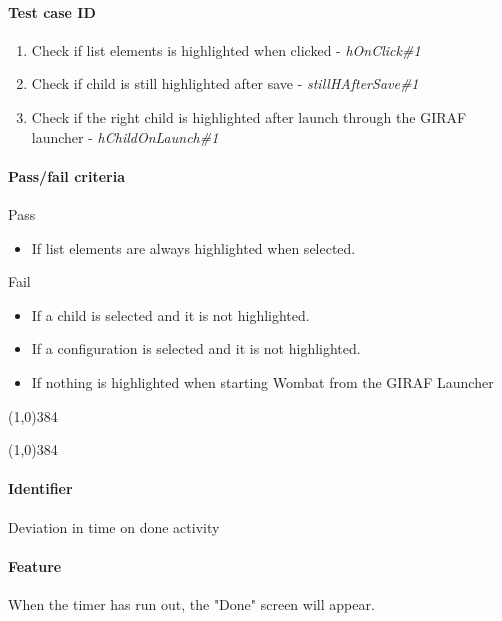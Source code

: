 \paragraph{Test case ID}
	\begin{enumerate}
		\item Check if list elements is highlighted when clicked - \textit{hOnClick\#1}
		\item Check if child is still highlighted after save - \textit{stillHAfterSave\#1}
		\item Check if the right child is highlighted after launch through the GIRAF launcher - \textit{hChildOnLaunch\#1}
	\end{enumerate}
\paragraph{Pass/fail criteria}
	Pass
	\begin{itemize}
		\item If list elements are always highlighted when selected.
	\end{itemize}
	Fail
	\begin{itemize}
		\item If a child is selected and it is not highlighted.
		\item If a configuration is selected and it is not highlighted.
		\item If nothing is highlighted when starting Wombat from the GIRAF Launcher
	\end{itemize}
	\begin{center}
	\line(1,0){384}
	\end{center}

\pagebreak
\begin{center}
	\line(1,0){384}
\end{center}
\paragraph{Identifier}
	Deviation in time on done activity
\paragraph{Feature}
	When the timer has run out, the "Done" screen will appear. 
